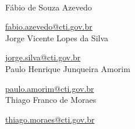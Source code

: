 \scalebox{2.0}{\sffamily Autores do Manual}
\\

Fábio de Souza Azevedo


\href{mailto:fabio.azevedo@cti.gov.br}{fabio.azevedo@cti.gov.br}
\\


Jorge Vicente Lopes da Silva


\href{mailto:jorge.silva@cti.gov.br}{jorge.silva@cti.gov.br}
\\


Paulo Henrique Junqueira Amorim


\href{mailto:paulo.amorim@cti.gov.br}{paulo.amorim@cti.gov.br}
\\


Thiago Franco de Moraes


\href{mailto:thiago.moraes@cti.gov.br}{thiago.moraes@cti.gov.br}
\\